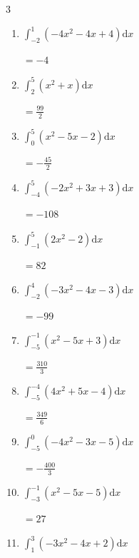 \begin{multicols}{3}
\begin{enumerate}
\columnbreak %

  \item $\displaystyle \int_{-2}^{1}\left( -4x^{2}-4x+4 \right) \mathrm{d}x$

        $\displaystyle =-4$

  \item $\displaystyle \int_{2}^{5}\left( x^{2}+x \right) \mathrm{d}x$

        $\displaystyle =\frac{99}{2}$

  \item $\displaystyle \int_{0}^{5}\left( x^{2}-5x-2 \right) \mathrm{d}x$

        $\displaystyle =-\frac{45}{2}$

  \item $\displaystyle \int_{-4}^{5}\left( -2x^{2}+3x+3 \right) \mathrm{d}x$

        $\displaystyle =-108$

  \item $\displaystyle \int_{-1}^{5}\left( 2x^{2}-2 \right) \mathrm{d}x$

        $\displaystyle =82$

\columnbreak %

  \item $\displaystyle \int_{-2}^{4}\left( -3x^{2}-4x-3 \right) \mathrm{d}x$

        $\displaystyle =-99$

  \item $\displaystyle \int_{-5}^{-1}\left( x^{2}-5x+3 \right) \mathrm{d}x$

        $\displaystyle =\frac{310}{3}$

  \item $\displaystyle \int_{-5}^{-4}\left( 4x^{2}+5x-4 \right) \mathrm{d}x$

        $\displaystyle =\frac{349}{6}$

  \item $\displaystyle \int_{-5}^{0}\left( -4x^{2}-3x-5 \right) \mathrm{d}x$

        $\displaystyle =-\frac{400}{3}$

  \item $\displaystyle \int_{-3}^{-1}\left( x^{2}-5x-5 \right) \mathrm{d}x$

        $\displaystyle =27$

\columnbreak %

\resetques

  \item $\displaystyle \int_{1}^{3}\left( -3x^{2}-4x+2 \right) \mathrm{d}x$


\end{enumerate}
\end{multicols}
